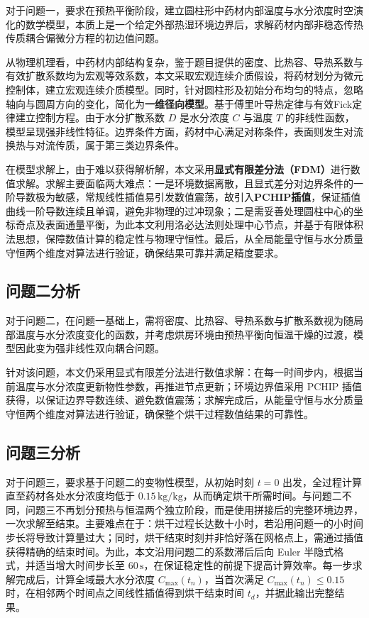 \documentclass[withoutpreface,bwprint]{cumcm_thesis}
\begin{document}
对于问题一，要求在预热平衡阶段，建立圆柱形中药材内部温度与水分浓度时空演化的数学模型，本质上是一个给定外部热湿环境边界后，求解药材内部非稳态传热传质耦合偏微分方程的初边值问题。

从物理机理看，中药材内部结构复杂，鉴于题目提供的密度、比热容、导热系数与有效扩散系数均为宏观等效系数，本文采取宏观连续介质假设，将药材划分为微元控制体，建立宏观连续介质模型。同时，针对圆柱形及初始分布均匀的特点，忽略轴向与圆周方向的变化，简化为\textbf{一维径向模型}。基于傅里叶导热定律与有效Fick定律建立控制方程。由于水分扩散系数 \(D\) 是水分浓度 \(C\) 与温度 \(T\) 的非线性函数，模型呈现强非线性特征。边界条件方面，药材中心满足对称条件，表面则发生对流换热与对流传质，属于第三类边界条件。

在模型求解上，由于难以获得解析解，本文采用\textbf{显式有限差分法（FDM）}进行数值求解。求解主要面临两大难点：一是环境数据离散，且显式差分对边界条件的一阶导数极为敏感，常规线性插值易引发数值震荡，故引入\textbf{PCHIP插值}，保证插值曲线一阶导数连续且单调，避免非物理的过冲现象；二是需妥善处理圆柱中心的坐标奇点及表面通量平衡，为此本文利用洛必达法则处理中心节点，并基于有限体积法思想，保障数值计算的稳定性与物理守恒性。最后，从全局能量守恒与水分质量守恒两个维度对算法进行验证，确保结果可靠并满足精度要求。

\subsection{问题二分析}	

对于问题二，在问题一基础上，需将密度、比热容、导热系数与扩散系数视为随局部温度与水分浓度变化的函数，并考虑烘房环境由预热平衡向恒温干燥的过渡，模型因此变为强非线性双向耦合问题。

针对该问题，本文仍采用显式有限差分法进行数值求解：在每一时间步内，根据当前温度与水分浓度更新物性参数，再推进节点更新；环境边界值采用 PCHIP 插值获得，以保证边界导数连续、避免数值震荡；求解完成后，从能量守恒与水分质量守恒两个维度对算法进行验证，确保整个烘干过程数值结果的可靠性。

\subsection{问题三分析}

对于问题三，要求基于问题二的变物性模型，从初始时刻 \(t=0\) 出发，全过程计算直至药材各处水分浓度均低于 \(0.15\,\text{kg/kg}\)，从而确定烘干所需时间。与问题二不同，问题三不再划分预热与恒温两个独立阶段，而是使用拼接后的完整环境边界，一次求解至结束。主要难点在于：烘干过程长达数十小时，若沿用问题一的小时间步长将导致计算量过大；同时，烘干结束时刻并非恰好落在网格点上，需通过插值获得精确的结束时间。为此，本文沿用问题二的系数滞后后向 Euler 半隐式格式，并适当增大时间步长至 \(60\,\text{s}\)，在保证稳定性的前提下提高计算效率。每一步求解完成后，计算全域最大水分浓度 \(C_{\max}(t_n)\)，当首次满足 \(C_{\max}(t_n) \le 0.15\) 时，在相邻两个时间点之间线性插值得到烘干结束时间 \(t_d\)，并据此输出完整结果。
\end{document}
